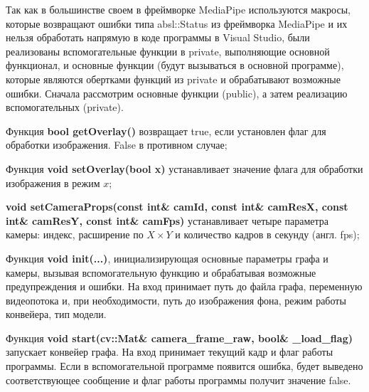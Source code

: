 \documentclass[a4paper,14pt]{extreport}
\begin{document}
        Так как в большинстве своем в фреймворке MediaPipe используются макросы, которые возвращают ошибки типа absl::Status из фреймворка MediaPipe и их нельзя обработать напрямую в коде программы в Visual Studio, были реализованы вспомогательные функции в private, выполняющие основной функционал, и основные функции (будут вызываться в основной программе), которые являются обертками функций из private и обрабатывают возможные ошибки. Сначала рассмотрим основные функции (public), а затем реализацию вспомогательных (private).

        Функция \textbf{bool getOverlay()} возвращает true, если установлен флаг для обработки изображения. False в противном случае;
        
        
        Функция \hypertarget{overlay}{}\textbf{void setOverlay(bool x)} устанавливает значение флага для обработки изображения в режим $x$;
        
        
        \hypertarget{camera}{}\textbf{void setCameraProps(const int\& camId, const int\& camResX, const int\& camResY, const int\& camFps)} устанавливает четыре параметра камеры: индекс, расширение по $X \times Y$ и количество кадров в секунду (англ. fps);
        
        
        Функция \hypertarget{init}{}\textbf{void init(...)}, инициализирующая основные параметры графа и камеры, вызывая вспомогательную функцию и обрабатывая возможные предупреждения и ошибки. На вход  принимает путь до файла графа, переменную видеопотока и, при необходимости, путь до изображения фона, режим работы конвейера, тип модели.
        
        
        Функция \hypertarget{start}{}\textbf{void start(cv::Mat\& camera\_frame\_raw, bool\& \_load\_flag)} запускает конвейер графа. На вход принимает текущий кадр и флаг работы программы. Если в вспомогательной программе появится ошибка, будет выведено соответствующее сообщение и флаг работы программы получит значение false.
        
\end{document}
